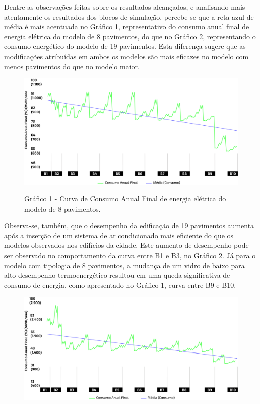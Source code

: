 \begin{onehalfspace}
    \noindent Dentre as observações feitas sobre os resultados alcançados, e analisando 
    mais atentamente os resultados dos blocos de simulação, percebe-se que a reta azul de 
    média é mais acentuada no Gráfico 1, representativo do consumo anual final de energia 
    elétrica do modelo de 8 pavimentos, do que no Gráfico 2, representando o consumo 
    energético do modelo de 19 pavimentos. Esta diferença sugere que as modificações 
    atribuídas em ambos os modelos são mais eficazes no modelo com menos pavimentos do que 
    no modelo maior.\vspace*{0.3cm}
    \begin{figure}[H]
        \centering
        \includegraphics[width=1\textwidth]{figures/grafico-8pav.png}
        \begin{flushleft}
            \small Gráfico 1 - Curva de Consumo Anual Final de energia elétrica do modelo de 8 pavimentos.
        \end{flushleft}
    \end{figure}
    \noindent Observa-se, também, que o desempenho da edificação de 19 pavimentos aumenta 
    após a inserção de um sistema de ar condicionado mais eficiente do que os modelos 
    observados nos edifícios da cidade. Este aumento de desempenho pode ser observado no 
    comportamento da curva entre B1 e B3, no Gráfico 2. Já para o modelo com tipologia de 
    8 pavimentos, a mudança de um vidro de baixo para alto desempenho termoenergético resultou 
    em uma queda significativa de consumo de energia, como apresentado no Gráfico 1, curva 
    entre B9 e B10.\vspace*{0.3cm}
    \begin{figure}[H]
        \centering
        \includegraphics[width=1\textwidth]{figures/grafico-19pav.png}

\end{figure}
\end{onehalfspace}
